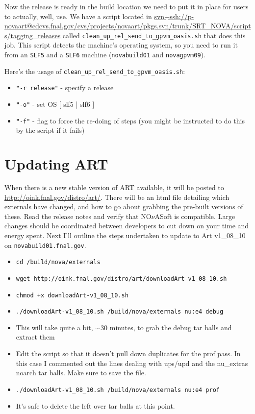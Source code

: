 \documentclass[letterpaper,10pt]{article}
\newcommand{\nova}{NO$\nu$A}
\begin{document}
Now the release is ready in the build location we need to put it in place for users to actually, well, use. We have a script located in \url{svn+ssh://p-novaart@cdcvs.fnal.gov/cvs/projects/novaart/pkgs.svn/trunk/SRT_NOVA/scripts/tagging_releases} called \verb|clean_up_rel_send_to_gpvm_oasis.sh| that does this job. This script detects the machine's operating system, so you need to run it from an \verb|SLF5| and a \verb|SLF6| machine (\verb|novabuild01| and \verb|novagpvm09|).

Here's the usage of \verb|clean_up_rel_send_to_gpvm_oasis.sh|:

\begin{itemize}

\item \verb|"-r release"| - specify a release
\item \verb|"-o"| - set OS [ slf5 | slf6 ]
\item \verb|"-f"| - flag to force the re-doing of steps (you might be instructed to do this by the script if it fails)

\end{itemize}





\section{Updating ART}


When there is a new stable version of ART available, it will be posted to \url{http://oink.fnal.gov/distro/art/}. There will be an html file detailing which externals have changed, and how to go about grabbing the pre-built versions of these. Read the release notes and verify that \nova Soft is compatible. Large changes should be coordinated between developers to cut down on your time and energy spent. Next I'll outline the steps undertaken to update to Art v1\_08\_10 on \verb|novabuild01.fnal.gov|.
\begin{itemize}
\item \verb|cd /build/nova/externals|
\item \verb|wget http://oink.fnal.gov/distro/art/downloadArt-v1_08_10.sh|
\item \verb|chmod +x downloadArt-v1_08_10.sh|
\item \verb|./downloadArt-v1_08_10.sh /build/nova/externals nu:e4 debug|
\item This will take quite a bit, $\sim$30 minutes, to grab the debug tar balls and extract them
\item Edit the script so that it doesn't pull down duplicates for the prof pass. In this case I commented out the lines dealing with ups/upd and the nu\_extras noarch tar balls. Make sure to save the file.
\item \verb|./downloadArt-v1_08_10.sh /build/nova/externals nu:e4 prof|
\item It's safe to delete the left over tar balls at this point.
\end{itemize}
\end{document}
